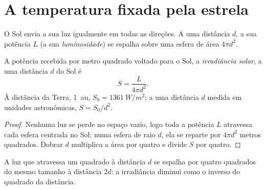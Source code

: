 \section{A temperatura fixada pela estrela}

O Sol envia a sua luz igualmente em todas as direções. A uma distância $d$,
a sua potência $L$ (a sua \emph{luminosidade}) se espalha sobre uma esfera
de área $4\pi d^2$.

\begin{proposition}\label{prop:g10:habitable-planet:inverse-square}
A potência recebida por metro quadrado voltado para o Sol, a
\emph{irradiância solar}, a uma distância $d$ do Sol é
\[
  S = \frac{L}{4\pi d^2}.
\]
À distância da Terra, \qty{1}{au}, $S_0 = \qty{1361}{W/m^2}$; a uma
distância $d$ medida em unidades astronômicas, $S = S_0/d^2$.
\end{proposition}

\begin{proof}
Nenhuma luz se perde no espaço vazio, logo toda a potência $L$ atravessa
cada esfera centrada no Sol; numa esfera de raio $d$, ela se reparte por
$4\pi d^2$ metros quadrados. Dobrar $d$ multiplica a área por quatro e
divide $S$ por quatro.
\end{proof}

\begin{omfigure}

{\small A luz que atravessa um quadrado à distância $d$ se espalha por
quatro quadrados do mesmo tamanho à distância $2d$: a irradiância diminui
como o inverso do quadrado da distância.}
\end{omfigure}

